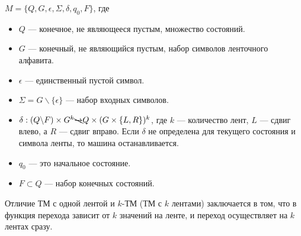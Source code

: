     
    \begin{Def}
    $M = \{Q, G, \epsilon, \Sigma, \delta, q_0, F\}$, где
    \begin{itemize}
        \item $Q$ --- конечное, не являющееся пустым, множество состояний.
        \item $G$ --- конечный, не являющийся пустым, набор символов ленточного алфавита.
        \item $\epsilon$ --- единственный пустой символ.
        \item $\Sigma = G \backslash \{\epsilon\}$ --- набор входных символов.
        \item $\delta : (Q \backslash F) \times G^k \bcancel{\rightarrow}
        Q \times (G \times \{L, R\})^k$, где $k$ --- количество лент, $L$ --- сдвиг влево, а $R$ --- сдвиг вправо. Если $\delta$ не определена для текущего состояния и символа ленты, то машина останавливается.
        \item $q_0$ --- это начальное состояние.
        \item $F \subset {Q}$  --- набор конечных состояний.
    \end{itemize}
    \end{Def}
    \begin{Rem}
        Отличие ТМ с одной лентой и $k$-ТМ (ТМ с $k$ лентами) заключается в том, что в функция перехода зависит от $k$ значений на ленте, и переход осуществляет на $k$ лентах сразу.
    \end{Rem}


